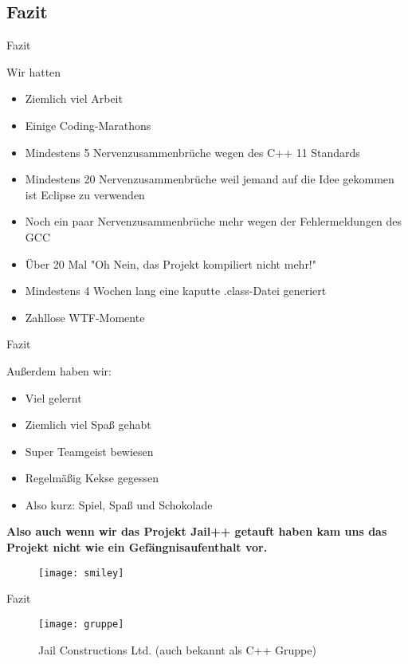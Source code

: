 \subsection{Fazit}

\begin{frame}{Fazit}

	\pause
	Wir hatten
	\pause
	\begin{itemize}
		\item Ziemlich viel Arbeit
		\pause
		\item Einige Coding-Marathons
		\pause
		\item Mindestens 5 Nervenzusammenbr\"uche wegen des C++ 11 Standards
		\pause
		\item Mindestens 20 Nervenzusammenbr\"uche weil jemand auf die Idee gekommen ist Eclipse zu verwenden
		\pause
		\item Noch ein paar Nervenzusammenbr\"uche mehr wegen der Fehlermeldungen des GCC
		\pause
		\item \"Uber 20 Mal "Oh Nein, das Projekt kompiliert nicht mehr!"
		\pause
		\item Mindestens 4 Wochen lang eine kaputte .class-Datei generiert
		\pause
		\item Zahllose WTF-Momente
	\end{itemize}

\end{frame}

\begin{frame}{Fazit}

	\pause
	Außerdem haben wir:
	\pause
	\begin{itemize}
		\item Viel gelernt
		\pause
		\item Ziemlich viel Spaß gehabt
		\pause
		\item Super Teamgeist bewiesen
		\pause
		\item Regelm\"aßig Kekse gegessen
		\pause
		\item Also kurz: Spiel, Spaß und Schokolade
		\pause
	\end{itemize} \newline \newline \vspace{5mm}	\textbf{\textcolor{fu-green}{Also auch wenn wir das Projekt Jail++ getauft haben	kam uns das Projekt nicht wie ein Gef\"angnisaufenthalt vor.}}
	
	\begin{figure}
		  \begin{center}
		    \leavevmode
		      \texttt{[image: smiley]}
		  \end{center}
		\end{figure}
	
\end{frame}

\begin{frame}{Fazit}

	\begin{figure}
	  \begin{center}
	    \leavevmode
	      \texttt{[image: gruppe]}
	    \caption{Jail Constructions Ltd. (auch bekannt als C++ Gruppe)}
	  \end{center}
	\end{figure}

\end{frame}